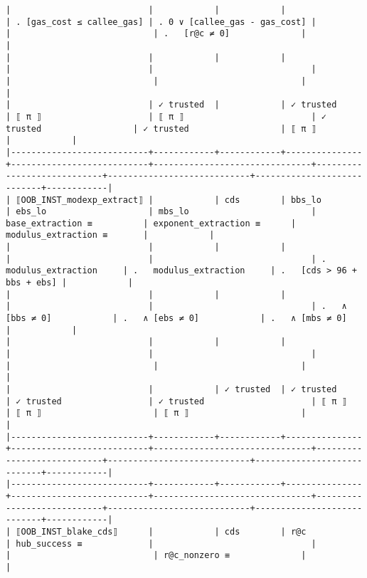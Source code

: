 \documentclass[varwidth=\maxdimen,margin=0.5cm,multi={verbatim}]{standalone}
\begin{document}
\begin{verbatim}
|                           |            |            |               | . [gas_cost ≤ callee_gas] | . 0 ∨ [callee_gas - gas_cost] |                            |                            | .   [r@c ≠ 0]              |            |
|                           |            |            |               |                           |                               |                            |                            |                            |            |
|                           | ✓ trusted  |            | ✓ trusted     | ⟦ π ⟧                     | ⟦ π ⟧                         | ✓ trusted                  | ✓ trusted                  | ⟦ π ⟧                      |            |
|---------------------------+------------+------------+---------------+---------------------------+-------------------------------+----------------------------+----------------------------+----------------------------+------------|
| ⟦OOB_INST_modexp_extract⟧ |            | cds        | bbs_lo        | ebs_lo                    | mbs_lo                        | base_extraction ≡          | exponent_extraction ≡      | modulus_extraction ≡       |            |
|                           |            |            |               |                           |                               | .   modulus_extraction     | .   modulus_extraction     | .   [cds > 96 + bbs + ebs] |            |
|                           |            |            |               |                           |                               | .   ∧ [bbs ≠ 0]            | .   ∧ [ebs ≠ 0]            | .   ∧ [mbs ≠ 0]            |            |
|                           |            |            |               |                           |                               |                            |                            |                            |            |
|                           |            | ✓ trusted  | ✓ trusted     | ✓ trusted                 | ✓ trusted                     | ⟦ π ⟧                      | ⟦ π ⟧                      | ⟦ π ⟧                      |            |
|---------------------------+------------+------------+---------------+---------------------------+-------------------------------+----------------------------+----------------------------+----------------------------+------------|
|---------------------------+------------+------------+---------------+---------------------------+-------------------------------+----------------------------+----------------------------+----------------------------+------------|
| ⟦OOB_INST_blake_cds⟧      |            | cds        | r@c           | hub_success ≡             |                               |                            |                            | r@c_nonzero ≡              |            |

\end{verbatim}
\end{document}
